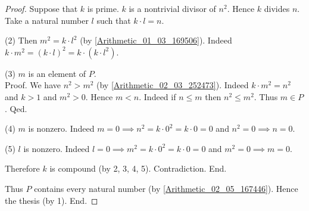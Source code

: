 \documentclass[../../arithmetic.ftl.tex]{subfiles}
\begin{document}
\begin{forthel}
\begin{proof}
          Suppose that $k$ is prime.
          $k$ is a nontrivial divisor of $n^{2}$.
          Hence $k$ divides $n$.
          Take a natural number $l$ such that $k \cdot l = n$.

          (2) Then $m^{2} = k \cdot l^{2}$ (by \ref{Arithmetic_01_03_169506}).
          Indeed $k \cdot m^{2} = (k \cdot l)^{2} = k \cdot (k \cdot l^{2})$.

          (3) $m$ is an element of $P$. \\
          Proof.
            We have $n^{2} > m^{2}$ (by \ref{Arithmetic_02_03_252473}).
            Indeed $k \cdot m^{2} = n^{2}$ and $k > 1$ and $m^{2} > 0$.
            Hence $m < n$.
            Indeed if $n \leq m$ then $n^{2} \leq m^{2}$.
            Thus $m \in P$.
          Qed.

          (4) $m$ is nonzero.
          Indeed $m = 0 \implies n^{2} = k \cdot 0^{2} = k \cdot 0 = 0$ and $n^{2} = 0 \implies n = 0$.

          (5) $l$ is nonzero.
          Indeed $l = 0 \implies m^{2} = k \cdot 0^{2} = k \cdot 0 = 0$ and $m^{2} = 0 \implies m = 0$.

          Therefore $k$ is compound (by 2, 3, 4, 5).
          Contradiction.
        End.

        Thus $P$ contains every natural number (by \ref{Arithmetic_02_05_167446}).
        Hence the thesis (by 1).
      End.
    \end{proof}
  \end{forthel}
\end{document}
